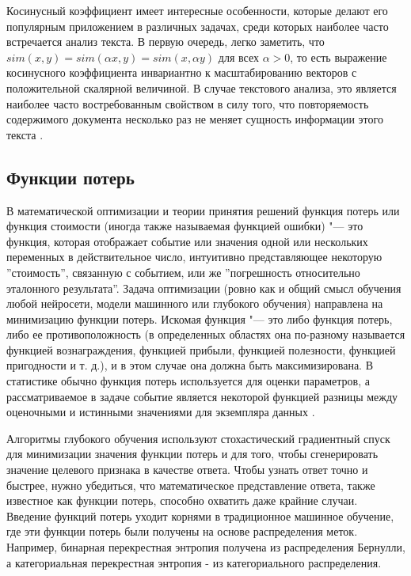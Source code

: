 \documentclass[bachelor, och, coursework]{SCWorks}
\begin{document}
        Косинусный коэффициент имеет интересные особенности, которые делают его
        популярным приложением в различных задачах, среди которых наиболее часто
        встречается анализ текста. В первую очередь, легко заметить, что $sim(x,
        y) = sim(\alpha x, y) = sim(x, \alpha y)$ для всех $\alpha > 0$, то есть
        выражение косинусного коэффициента инвариантно к масштабированию
        векторов с положительной скалярной величиной. В случае текстового
        анализа, это является наиболее часто востребованным свойством в силу
        того, что повторяемость содержимого документа несколько раз не меняет
        сущность информации этого текста \cite{metrics3}.     

    \subsection{Функции потерь}


        В математической оптимизации и теории принятия решений функция потерь
        или функция стоимости (иногда также называемая функцией ошибки) "--- это
        функция, которая отображает событие или значения одной или нескольких
        переменных в действительное число, интуитивно представляющее некоторую
        ''стоимость'', связанную с событием, или же ''погрешность относительно
        эталонного результата''. Задача оптимизации (ровно как и общий смысл
        обучения любой нейросети, модели машинного или глубокого обучения)
        направлена на минимизацию функции потерь. Искомая функция "--- это либо
        функция потерь, либо ее противоположность (в определенных областях она
        по-разному называется функцией вознаграждения, функцией прибыли,
        функцией полезности, функцией пригодности и т. д.), и в этом случае она
        должна быть максимизирована. В статистике обычно функция потерь
        используется для оценки параметров, а рассматриваемое в задаче событие
        является некоторой функцией разницы между оценочными и истинными
        значениями для экземпляра данных \cite{celoss1}.


        Алгоритмы глубокого обучения используют стохастический градиентный спуск
        для минимизации значения функции потерь и для того, чтобы сгенерировать
        значение целевого признака в качестве ответа. Чтобы узнать ответ точно и
        быстрее, нужно убедиться, что математическое представление ответа, также
        известное как функции потерь, способно охватить даже крайние случаи.
        Введение функций потерь уходит корнями в традиционное машинное обучение,
        где эти функции потерь были получены на основе распределения меток.
        Например, бинарная перекрестная энтропия получена из распределения
        Бернулли, а категориальная перекрестная энтропия - из категориального
        распределения.
\end{document}
